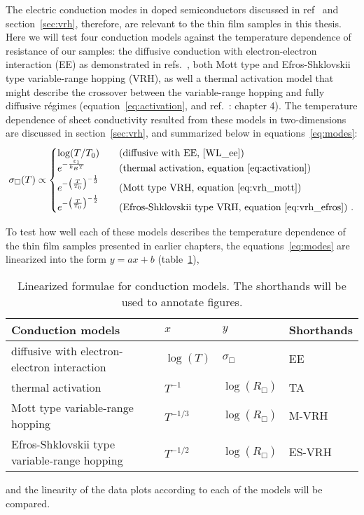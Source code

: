 The electric conduction modes in doped semiconductors discussed in ref~\cite{schklovskii_efros} and section~\ref{sec:vrh}, therefore, are relevant to the thin film samples in this thesis. Here we will test four conduction models against the temperature dependence of resistance of our samples: the diffusive conduction with electron-electron interaction (EE) as demonstrated in refs.~\cite{Chen2011, Liu2011, Roy2013, liao2015}, both Mott type and Efros-Shklovskii type variable-range hopping (VRH), as well a thermal activation model that might describe the crossover between the variable-range hopping and fully diffusive r\'egimes (equation~\ref{eq:activation}, and ref.~\cite{schklovskii_efros}: chapter 4). The temperature dependence of sheet conductivity resulted from these models in two-dimensions are discussed in section~\ref{sec:vrh}, and summarized below in equations~\ref{eq:modes}:%
\begin{equation}\label{eq:modes}
    \sigma_\Box(T) \propto %
    \begin{cases}
        \log(T / T_0)  & \quad \text{(diffusive with EE, \cite{WL_ee})}\\
        e^{-\frac{\varepsilon_1}{k_B T}}   & \quad \text{(thermal activation, equation~\ref{eq:activation})}\\
        e^{-\left(\frac{T}{T_0}\right)^{-\frac{1}{3}}}   & \quad \text{(Mott type VRH, equation~\ref{eq:vrh_mott})}\\
        e^{-\left(\frac{T}{T_0}\right)^{-\frac{1}{2}}} & \quad \text{(Efros-Shklovskii type VRH, equation~\ref{eq:vrh_efros})}~.
    \end{cases}
\end{equation}%

To test how well each of these models describes the temperature dependence of the thin film samples presented in earlier chapters, the equations~\ref{eq:modes} are linearized into the form $y=ax+b$ (table~\ref{tab:models}), %
\begin{table}[ht]
    \centering
    \begin{tabularx}{0.95\columnwidth}[t]{l|l|l|X}
    \caption[Linearized formulae for conduction models]{\label{tab:models}Linearized formulae for conduction models. The shorthands will be used to annotate figures.}\\
		\hline\hline
        Conduction models & $x$ & $y$ & Shorthands\\
        \hline%
        diffusive with electron-electron interaction & $\log(T)$ & $\sigma_\Box$ & EE\\
        thermal activation & $T^{-1}$ & $\log\left(R_\Box\right)$ & TA\\
        Mott type variable-range hopping & $T^{-1/3}$ & $\log\left(R_\Box\right)$ & M-VRH\\
        Efros-Shklovskii type variable-range hopping & $T^{-1/2}$ & $\log\left(R_\Box\right)$ & ES-VRH\\
		\hline\hline
    \end{tabularx}
\end{table}%
%
and the linearity of the data plots according to each of the models will be compared.

